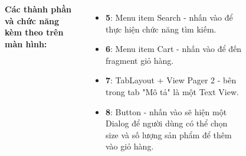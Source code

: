 \documentclass{beamer}
\begin{document}
\begin{frame}
\begin{columns}
\begin{figure}
        \end{figure}
        \indent \textbf{Các thành phần và chức năng kèm theo trên màn hình:}
        \begin{itemize}
            \item \textbf{5}: Menu item Search - nhấn vào để thực hiện chức năng tìm kiếm.
            \item \textbf{6}: Menu item Cart - nhấn vào để đến fragment giỏ hàng.
            \item \textbf{7}: TabLayout + View Pager 2 - bên trong tab "Mô tả" là một Text View.
            \item \textbf{8}: Button - nhấn vào sẽ hiện một Dialog để người dùng có thể chọn size và số lượng sản phẩm để thêm vào giỏ hàng.
        \end{itemize}
    \end{columns}
\end{frame}
\end{document}

